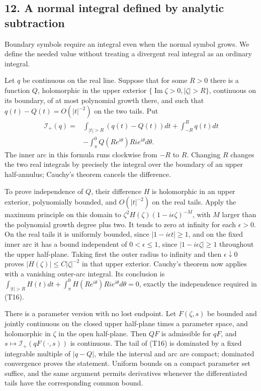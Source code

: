 \documentclass[
  11pt,
]{article}
\begin{document}
\subsection{12. A normal integral defined by analytic
subtraction}\label{a-normal-integral-defined-by-analytic-subtraction}

Boundary symbols require an integral even when the normal symbol grows.
We define the needed value without treating a divergent real integral as
an ordinary integral.

Let \(q\) be continuous on the real line. Suppose that for some \(R>0\)
there is a function \(Q\), holomorphic in the upper exterior
\(\{\operatorname{Im}\zeta>0,|\zeta|>R\}\), continuous on its boundary,
of at most polynomial growth there, and such that
\(q(t)-Q(t)=O(|t|^{-2})\) on the two tails. Put \[
\begin{split}
\mathcal I_+(q)={}&
\int_{|t|>R}(q(t)-Q(t))dt+\int_{-R}^{R}q(t)dt\\
&-\int_{\pi}^{0}Q(Re^{i\theta})Ri e^{i\theta}d\theta.
\end{split}
\tag{T16}
\] The inner arc in this formula runs clockwise from \(-R\) to \(R\).
Changing \(R\) changes the two real integrals by precisely the integral
over the boundary of an upper half-annulus; Cauchy's theorem cancels the
difference.

To prove independence of \(Q\), their difference \(H\) is holomorphic in
an upper exterior, polynomially bounded, and \(O(|t|^{-2})\) on the real
tails. Apply the maximum principle on this domain to
\(\zeta^2H(\zeta)(1-i\epsilon\zeta)^{-M}\), with \(M\) larger than the
polynomial growth degree plus two. It tends to zero at infinity for each
\(\epsilon>0\). On the real tails it is uniformly bounded, since
\(|1-i\epsilon t|\geq1\), and on the fixed inner arc it has a bound
independent of \(0<\epsilon\leq1\), since \(|1-i\epsilon\zeta|\geq1\)
throughout the upper half-plane. Taking first the outer radius to
infinity and then \(\epsilon\downarrow0\) proves
\(|H(\zeta)|\leq C|\zeta|^{-2}\) in that upper exterior. Cauchy's
theorem now applies with a vanishing outer-arc integral. Its conclusion
is
\(\int_{|t|>R}H(t)dt+\int_\pi^0H(Re^{i\theta})Ri e^{i\theta}d\theta=0\),
exactly the independence required in (T16).

There is a parameter version with no lost endpoint. Let \(F(\zeta,s)\)
be bounded and jointly continuous on the closed upper half-plane times a
parameter space, and holomorphic in \(\zeta\) in the open half-plane.
Then \(QF\) is admissible for \(qF\), and
\(s\mapsto\mathcal I_+(qF(\cdot,s))\) is continuous. The tail of (T16)
is dominated by a fixed integrable multiple of \(|q-Q|\), while the
interval and arc are compact; dominated convergence proves the
statement. Uniform bounds on a compact parameter set suffice, and the
same argument permits derivatives whenever the differentiated tails have
the corresponding common bound.
\end{document}
